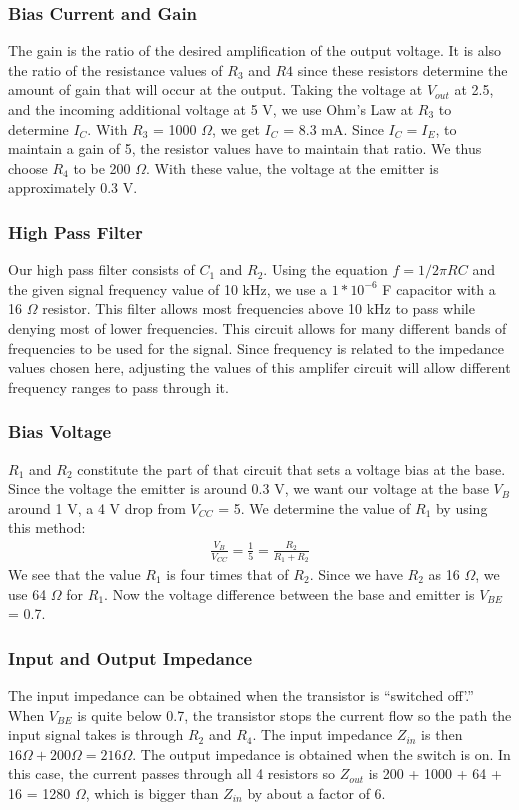 \documentclass[12pt]{article}
\begin{document}
\subsubsection{Bias Current and Gain}
The gain is the ratio of the desired amplification of the output
voltage. It is also the ratio of the resistance values of $R_{3}$ and
$R{4}$ since these resistors determine the amount of gain that will
occur at the output. Taking the voltage at $V_{out}$ at 2.5, and the
incoming additional voltage at 5 V, we use Ohm's Law at $R_{3}$ to
determine $I_{C}$. With $R_{3}$ = 1000 $\Omega$, we get $I_{C}$ = 8.3 mA. Since
$I_{C} = I_{E}$, to maintain a gain of 5, the resistor values have to
maintain that ratio. We thus choose $R_{4}$ to be 200 $\Omega$. With
these value, the voltage at the emitter is approximately 0.3 V.

\subsubsection{High Pass Filter}
Our high pass filter consists of $C_{1}$ and $R_{2}$. Using the equation
$f=1/2\pi{RC}$ and the given signal frequency value of 10 kHz, we use a
$1 * 10^{-6}$ F capacitor with a 16 $\Omega$ resistor. This filter
allows most frequencies above 10 kHz to pass while denying most of lower
frequencies. This circuit allows for many different bands of frequencies
to be used for the signal. Since frequency is related to the impedance
values chosen here, adjusting the values of this amplifer circuit will
allow different frequency ranges to pass through it. 

\subsubsection{Bias Voltage}
$R_{1}$ and $R_{2}$ constitute the part of that circuit that sets a
voltage bias at the base. Since the voltage the emitter is around 0.3 V, we want our
voltage at the base $V_{B}$ around 1 V, a 4 V drop from $V_{CC}$ = 5.
We determine the value of $R_{1}$ by using this method:
\begin{align}\frac{V_{B}}{V_{CC}} = \frac{1}{5} = \frac{R_{2}}{R_{1} +
    R_{2}}\end{align}
We see that the value $R_{1}$ is four times that of $R_{2}$. Since we
have $R_{2}$ as 16 $\Omega$, we use 64 $\Omega$ for $R_{1}$. Now the
voltage difference between the base and emitter is $V_{BE}$ = 0.7.
\subsubsection{Input and Output Impedance}
The input impedance can be obtained when the transistor is ``switched
off'.'' When $V_{BE}$ is quite below 0.7, the transistor stops the
current flow so the path the input signal takes is through $R_{2}$ and
$R_{4}$. The input impedance $Z_{in}$ is then $16 \Omega + 200 \Omega = 216
\Omega$. The output impedance is obtained when the switch is on. In this
case, the current passes through all 4 resistors so $Z_{out}$ is 200 +
1000 + 64 + 16 = 1280 $\Omega$, which is bigger than $Z_{in}$ by about a
factor of 6.
\end{document}
